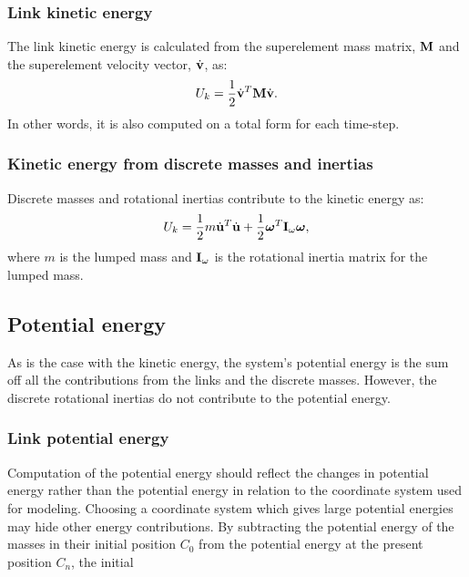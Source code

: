 \subsubsection{Link kinetic energy}

The link kinetic energy is calculated from the superelement 
mass matrix, ${\bf M}$ and the superelement velocity vector, 
$\dot{\bf v}$, as:
%
\begin{equation}
U_{k} = \frac{{1}}{{2}} \dot{\bf v}^{T}{\bf M}
\dot{\bf v} .
\label{eqEC:84}
\end{equation}
%
\noindent
In other words, it is also computed on a total form for each time-step.

\subsubsection{Kinetic energy from discrete masses and inertias}

Discrete masses and rotational inertias contribute to the kinetic energy as:
%
\begin{equation}
U_{k} = \frac{{1}}{{2}}m \dot{\bf u}^{T} 
\dot{\bf u} + \frac{{1}}{{2}}{\boldsymbol{\omega}}^{T}{\bf I}_{\omega} \boldsymbol{\omega} ,
\label{eqEC:85}
\end{equation}
%
\noindent
where ${m}$ is the lumped mass and ${\bf I}_\omega $ is the 
rotational inertia matrix for the lumped mass.

\subsection{Potential energy}

As is the case with the kinetic energy, the system's potential energy is the sum off all 
the contributions from the links and the discrete masses. However, the 
discrete rotational inertias do not contribute to the potential energy.

\subsubsection{Link potential energy}

Computation of the potential energy should reflect the changes in potential 
energy rather than the potential energy in relation to the coordinate system 
used for modeling. Choosing a coordinate system which gives large potential energies may hide
other energy contributions. 
By subtracting the potential energy of the masses in their 
initial position ${C_0}$ from the potential energy at the present position ${C_n}$, the initial

